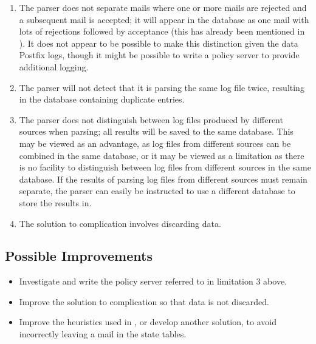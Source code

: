 \begin{enumerate}
    \item The parser does not separate mails where one or more mails are
        rejected and a subsequent mail is accepted; it will appear in the
        database as one mail with lots of rejections followed by acceptance
        (this has already been mentioned in ).
        It does not appear to be possible to make this distinction given
        the data Postfix logs, though it might be possible to write a
        policy server to provide additional logging.

    \item The parser will not detect that it is parsing the same log file
        twice, resulting in the database containing duplicate entries.

    \item The parser does not distinguish between log files produced by
        different sources when parsing; all results will be saved to the
        same database.  This may be viewed as an advantage, as log files
        from different sources can be combined in the same database, or it
        may be viewed as a limitation as there is no facility to
        distinguish between log files from different sources in the same
        database.  If the results of parsing log files from different
        sources must remain separate, the parser can easily be instructed
        to use a different database to store the results in.

    \item The solution to complication  involves discarding data.

\end{enumerate}

\subsection{Possible Improvements}

\begin{itemize}

    \item Investigate and write the policy server referred to in limitation
        3 above.

    \item Improve the solution to complication  so that data is not discarded.

    \item Improve the heuristics used in
        , or develop another
        solution, to avoid incorrectly leaving a mail in the state tables.

\end{itemize}


